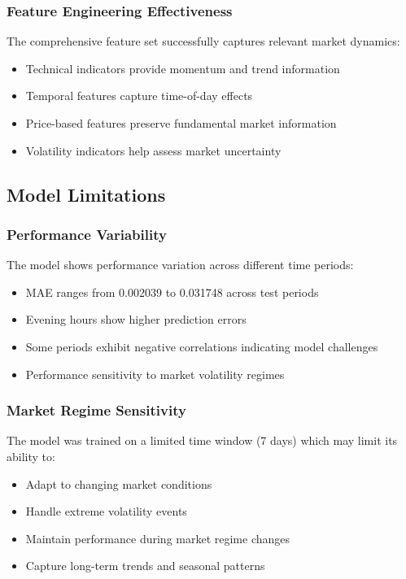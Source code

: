 \documentclass[11pt,a4paper]{article}
\begin{document}
\subsubsection{Feature Engineering Effectiveness}

The comprehensive feature set successfully captures relevant market dynamics:
\begin{itemize}
    \item Technical indicators provide momentum and trend information
    \item Temporal features capture time-of-day effects
    \item Price-based features preserve fundamental market information
    \item Volatility indicators help assess market uncertainty
\end{itemize}

\subsection{Model Limitations}

\subsubsection{Performance Variability}

The model shows performance variation across different time periods:
\begin{itemize}
    \item MAE ranges from 0.002039 to 0.031748 across test periods
    \item Evening hours show higher prediction errors
    \item Some periods exhibit negative correlations indicating model challenges
    \item Performance sensitivity to market volatility regimes
\end{itemize}

\subsubsection{Market Regime Sensitivity}

The model was trained on a limited time window (7 days) which may limit its ability to:
\begin{itemize}
    \item Adapt to changing market conditions
    \item Handle extreme volatility events
    \item Maintain performance during market regime changes
    \item Capture long-term trends and seasonal patterns
\end{itemize}
\end{document}
